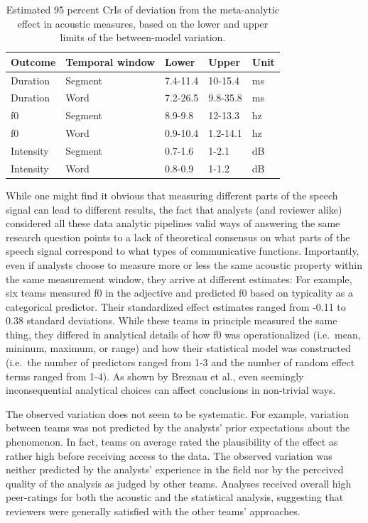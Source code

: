 \documentclass[Review,times,sageh]{sagej}
\begin{document}
\begin{table}

\caption{\label{tab:msa-sd-table}Estimated 95 percent CrIs of deviation from the meta-analytic effect in acoustic measures, based on the lower and upper limits of the between-model variation.}
\centering
\fontsize{11}{13}\selectfont
\begin{tabular}[t]{lllll}
\toprule
Outcome & Temporal window & Lower & Upper & Unit\\
\midrule
Duration & Segment & 7.4-11.4 & 10-15.4 & ms\\
Duration & Word & 7.2-26.5 & 9.8-35.8 & ms\\
f0 & Segment & 8.9-9.8 & 12-13.3 & hz\\
f0 & Word & 0.9-10.4 & 1.2-14.1 & hz\\
Intensity & Segment & 0.7-1.6 & 1-2.1 & dB\\
Intensity & Word & 0.8-0.9 & 1-1.2 & dB\\
\bottomrule
\end{tabular}
\end{table}

While one might find it obvious that measuring different parts of the speech signal can lead to different results, the fact that analysts (and reviewer alike) considered all these data analytic pipelines valid ways of answering the same research question points to a lack of theoretical consensus on what parts of the speech signal correspond to what types of communicative functions.
Importantly, even if analysts choose to measure more or less the same acoustic property within the same measurement window, they arrive at different estimates:
For example, six teams measured f0 in the adjective and predicted f0 based on typicality as a categorical predictor. Their standardized effect estimates ranged from -0.11 to 0.38 standard deviations.
While these teams in principle measured the same thing, they differed in analytical details of how f0 was operationalized (i.e.~mean, mininum, maximum, or range) and how their statistical model was constructed (i.e.~the number of predictors ranged from 1-3 and the number of random effect terms ranged from 1-4).
As shown by Breznau et al.\citeyearpar{breznau2021observing}, even seemingly inconsequential analytical choices can affect conclusions in non-trivial ways.

The observed variation does not seem to be systematic.
For example, variation between teams was not predicted by the analysts' prior expectations about the phenomenon.
In fact, teams on average rated the plausibility of the effect as rather high before receiving access to the data.
The observed variation was neither predicted by the analysts' experience in the field nor by the perceived quality of the analysis as judged by other teams.
Analyses received overall high peer-ratings for both the acoustic and the statistical analysis, suggesting that reviewers were generally satisfied with the other teams' approaches.
\end{document}

